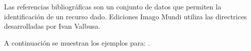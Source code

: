 \documentclass{book}
\begin{document}
{{{{{{{{{{{{{{{{{\noindent Las referencias bibliográficas son un conjunto de datos que permiten la identificación de un recurso dado. Ediciones Imago Mundi utiliza las directrices desarrolladas por Ivan Valbusa.

A continuación se muestran los ejemplos para: \textcite{Giaretta2009,Lobacevskij1994,Marx2004,Chu2012,Baron2002,CONADEP1984,Alfaro1999,Bargsted2003,Aguila2018,Schneider2018,Trotski1938,Heidegger2001,Marx2002,stage,Jackson2001,KDW2008,Audring1985,Cohen1980,Anonimo1980,Kicillof2015,Agosti1974,salam1968,nietzsche:1988,westfahl:space,westfahl:frontier,moore:related,moore1965,aristotle:rhetoric,cicero1995,coleridge1983}.


\printbibliography[annotation=true,keyword=algunos-ejemplos,heading=none]

%
%
%
%
%
%
%
%
%
%


}}}}}}}}}}}}}}}}}
\end{document}
